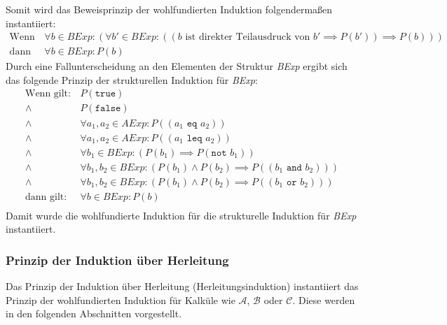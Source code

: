 				    Somit wird das Beweisprinzip der wohlfundierten Induktion folgendermaßen instantiiert:
				    \begin{align*}
					    \text{Wenn gilt:} & \,\forall b \in \textit{BExp} : (\forall b' \in \textit{BExp} : ((b \text{ ist direkter Teilausdruck von } b' \implies P(b')) \implies P(b))) \\
						\text{dann gilt:} & \,\forall b \in \textit{BExp} : P(b)
				    \end{align*}
				    Durch eine Fallunterscheidung an den Elementen der Struktur \textit{BExp} ergibt sich das folgende Prinzip der strukturellen Induktion für \textit{BExp}:
				    \begin{align*}
					    \text{Wenn gilt:} & \,P(\texttt{true}) \\
					    \land & \,P(\texttt{false}) \\
					    \land & \,\forall a _ 1, a _ 2 \in \textit{AExp} : P((a _ 1 \texttt{ eq } a _ 2)) \\
					    \land & \,\forall a _ 1, a _ 2 \in \textit{AExp} : P((a _ 1 \texttt{ leq } a _ 2)) \\
						\land & \,\forall b _ 1 \in \textit{BExp} : (P(b _ 1) \implies P(\texttt{not } b _ 1)) \\
					    \land & \,\forall b _ 1, b _ 2 \in \textit{BExp} : (P(b _ 1) \land P(b _ 2) \implies P((b _ 1 \texttt{ and } b _ 2))) \\
					    \land & \,\forall b _ 1, b _ 2 \in \textit{BExp} : (P(b _ 1) \land P(b _ 2) \implies P((b _ 1 \texttt{ or } b _ 2))) \\
					    \text{dann gilt:} & \,\forall b \in \textit{BExp} : P(b) \\
				    \end{align*}
				    Damit wurde die wohlfundierte Induktion für die strukturelle Induktion für \textit{BExp} instantiiert.
		    
		    \subsubsection{Prinzip der Induktion über Herleitung}
			    Das Prinzip der Induktion über Herleitung (Herleitungsinduktion) instantiiert das Prinzip der wohlfundierten Induktion für Kalküle wie $ \mathcal{A} $, $ \mathcal{B} $ oder $ \mathcal{C} $. Diese werden in den folgenden Abschnitten vorgestellt.
		    
			    
